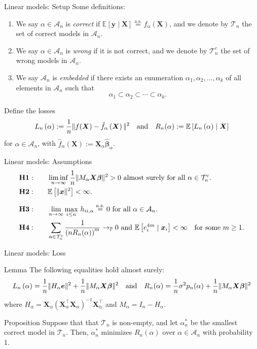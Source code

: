 \documentclass{beamer}
\newcommand{\0}{\emptyset}
\newcommand{\prob}{\mathbb{P}}
\newcommand{\Ep}[1]{\mathbb{E}\left[ #1 \right]}
\newcommand{\paren}[1]{\left(#1 \right)}
\newcommand{\norm}[1]{|\hspace{-1pt}|#1 |\hspace{-1pt}|}
\newcommand{\normsq}[1]{\norm{#1}^{2}}
\newcommand{\Acal}{\mathcal{A}_{n}}
\newcommand{\Tcal}{\mathcal{T}_{n}}
\newcommand{\aseq}{\stackrel{\mathrm{a.s.}}{=}}
\newcommand{\X}{\boldsymbol{X}}
\newcommand{\x}{\boldsymbol{x}}
\newcommand{\y}{\boldsymbol{y}}
\newcommand{\e}{\boldsymbol{e}}
\newcommand{\bbeta}{\boldsymbol{\beta}}
\newcommand{\bbetahat}{\boldsymbol{\hat{\beta}}}
\newcommand{\Loss}[1]{L_{n}\paren{#1}}
\newcommand{\1}{\mathmybb{1}}
\begin{document}
\begin{frame}{Linear models: Setup}
  Some definitions:
  \begin{enumerate}
    \item We say \(\alpha\in\Acal\) is \emph{correct} if \(\Ep{\y\mid\X}\aseq f_{\alpha}(\X)\), and we denote by \(\Tcal\) the set of correct models in \(\Acal\).
    \item We say \(\alpha\in\Acal\) is \emph{wrong} if it is not correct, and we denote by \(\Tcal^{c}\) the set of wrong models in \(\Acal\).
    \item We say \(\Acal\) is \emph{embedded} if there exists an enumeration \(\alpha_{1}, \alpha_{2}, \ldots, \alpha_{k}\) of all elements in \(\Acal\) such that \[\alpha_{1}\subset\alpha_{2}\subset\cdots\subset\alpha_{k}.\]
\end{enumerate}

Define the losses
\[\Loss{\alpha}:=\frac{1}{n}\normsq{f(\X) - \hat{f}_{\alpha}\paren{\X}}\quad\text{and}\quad R_{n}(\alpha):= \Ep{\Loss{\alpha}\mid\X}\]
for \(\alpha\in\Acal\), with \(\hat{f}_{\alpha}(\X):=\X_{\alpha}\bbetahat_{\alpha}\).

\end{frame}

\begin{frame}{Linear models: Assumptions}
  \begin{align*}
    &\mathbf{H1:}\qquad \liminf_{n\to\infty} \frac{1}{n}\normsq{M_{\alpha}\X\bbeta}>0 \text{ almost surely for all }\alpha \in\Tcal^{c}.\\
    &\mathbf{H2:} \qquad \Ep{\normsq{\x}}<\infty.\\[2.5mm]
    &\mathbf{H3:}\qquad \lim_{n\to\infty}\max_{i\leq n}\,h_{ii,\alpha} \aseq 0 \text{ for all }\alpha \in\Acal.\\
    &\mathbf{H4:}\qquad \sum_{\alpha\in\Tcal^{c}}\frac{1}{\paren{nR_{n}(\alpha)}^{m}}\to_{\prob}0\text{ and }\Ep{e_i^{4m}\mid\x_i}<\infty\quad\text{for some }m\geq 1.
  \end{align*}
\end{frame}

\begin{frame}{Linear models: Loss}
  \begin{block}{Lemma}
    The following equalities hold almost surely:
    \[\Loss{\alpha} = \frac{1}{n}\normsq{H_{\alpha}\e} + \frac{1}{n}\normsq{M_{\alpha}\X\bbeta}\quad\text{and}\quad R_{n}(\alpha) = \frac{1}{n}\sigma^{2}p_{n}(\alpha) + \frac{1}{n}\normsq{M_{\alpha}\X\bbeta}\]
    where \(H_{\alpha} = \X_{\alpha}\paren{\X_{\alpha}^{\top}\X_{\alpha}}^{-1}\X_{\alpha}^{\top}\) and \(M_{\alpha}= I_{n} - H_{\alpha}\).
  \end{block}
  \begin{block}{Proposition}
    Suppose that that \(\Tcal\) is non-empty, and let \(\alpha^{*}_{n}\) be the smallest correct model in \(\Tcal\). Then, \(\alpha^{*}_{n}\) minimizes \(R_{n}(\alpha)\) over \(\alpha\in\Acal\) with probability 1.
  \end{block}

\end{frame}
\end{document}
